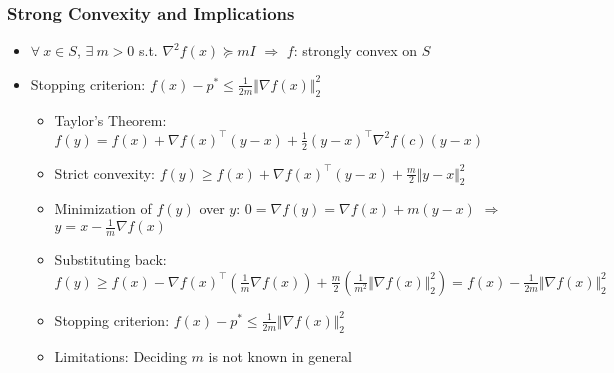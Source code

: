 \subsubsection*{Strong Convexity and Implications}
\begin{itemize}
    \item $\forall~x\in S$, $\exists~m>0$ s.t. $\nabla^2 f(x)\succeq mI$ $\Rightarrow$ $f$: strongly convex on $S$
    \item Stopping criterion: $f(x)-p^\ast\leq\frac{1}{2m}\Vert\nabla f(x)\Vert_2^2$
    \begin{itemize}
        \item Taylor's Theorem: $f(y)=f(x)+\nabla f(x)^{\top}(y-x)+\frac{1}{2}(y-x)^{\top}\nabla^2f(c)(y-x)$
        \item Strict convexity: $f(y)\geq f(x)+\nabla f(x)^{\top}(y-x)+\frac{m}{2}\Vert y-x\Vert_2^2$
        \item Minimization of $f(y)$ over $y$: $0=\nabla f(y)=\nabla f(x)+m(y-x)$ $\Rightarrow$ $y=x-\frac{1}{m}\nabla f(x)$
        \item Substituting back: $f(y)\geq f(x)-\nabla f(x)^{\top}\left(\frac{1}{m}\nabla f(x)\right)+\frac{m}{2}\left(\frac{1}{m^2}\Vert\nabla f(x)\Vert_2^2\right)=f(x)-\frac{1}{2m}\Vert\nabla f(x)\Vert_2^2$
        \item Stopping criterion: $f(x)-p^\ast\leq\frac{1}{2m}\Vert\nabla f(x)\Vert_2^2$
        \item Limitations: Deciding $m$ is not known in general
    \end{itemize}
\end{itemize}

